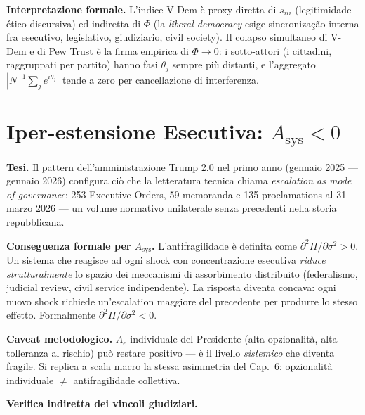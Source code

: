 \Hypoth{} \textbf{Interpretazione formale.} L'indice V-Dem è proxy
diretta di \(s_{iii}\) (legitimidade ético-discursiva) ed indiretta di
\(\Phi\) (la \emph{liberal democracy} esige sincronização interna fra
esecutivo, legislativo, giudiziario, civil society). Il colapso
simultaneo di V-Dem e di Pew Trust è la firma empirica di
\(\Phi \to 0\): i sotto-attori (i cittadini, raggruppati per partito)
hanno fasi \(\theta_j\) sempre più distanti, e l'aggregato
\(|N^{-1}\sum_j e^{i\theta_j}|\) tende a zero per cancellazione di
interferenza.



\section{\texorpdfstring{Iper-estensione Esecutiva:
\(A_{\text{sys}} < 0\)}{Iper-estensione Esecutiva: A\_\{\textbackslash text\{sys\}\} \textless{} 0}}\label{hiperextensão-esecutiva-a_textsys-0}

\Hypoth{} \textbf{Tesi.} Il pattern dell'amministrazione Trump 2.0 nel
primo anno (gennaio 2025 --- gennaio 2026) configura ciò che la
letteratura tecnica chiama \emph{escalation as mode of governance}: 253
Executive Orders, 59 memoranda e 135 proclamations al 31 marzo 2026 ---
un volume normativo unilaterale senza precedenti nella storia
repubblicana.

\Proved{} \textbf{Conseguenza formale per \(A_{\text{sys}}\).}
L'antifragilidade è definita come
\(\partial^2 \Pi / \partial \sigma^2 > 0\). Un sistema che reagisce ad
ogni shock con concentrazione esecutiva \emph{riduce strutturalmente} lo
spazio dei meccanismi di assorbimento distribuito (federalismo, judicial
review, civil service indipendente). La risposta diventa concava: ogni
nuovo shock richiede un'escalation maggiore del precedente per produrre
lo stesso effetto. Formalmente
\(\partial^2 \Pi / \partial \sigma^2 < 0\).

\Conj{} \textbf{Caveat metodologico.} \(A_e\) individuale del Presidente
(alta opzionalità, alta tolleranza al rischio) può restare positivo ---
è il livello \emph{sistemico} che diventa fragile. Si replica a scala
macro la stessa asimmetria del Cap.~6: opzionalità individuale \(\neq\)
antifragilidade collettiva.

\Proved{} \textbf{Verifica indiretta dei vincoli giudiziari.}

